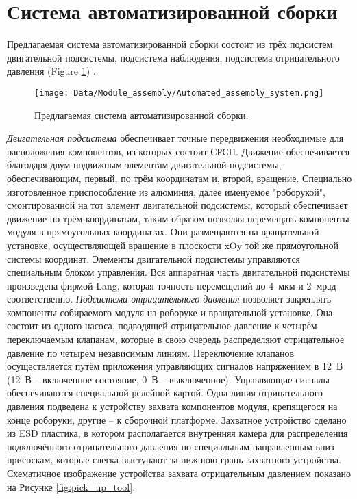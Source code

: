 \section{Система автоматизированной сборки}

Предлагаемая система автоматизированной сборки состоит из трёх подсистем: двигательной подсистемы, подсистема наблюдения, подсистема отрицательного давления (Figure \ref{fig:auto_assembly_system}) \cite{AutomatedAssembly_tutorial}.

\begin{figure}[ht]\centering
\texttt{[image: Data/Module\_assembly/Automated\_assembly\_system.png]}
\caption{Предлагаемая система автоматизированной сборки.}
\label{fig:auto_assembly_system}
\end{figure}

\emph{Двигательная подсистема} обеспечивает точные передвижения необходимые для расположения компонентов, из которых состоит СРСП. Движение обеспечивается благодаря двум подвижным элементам двигательной подсистемы, обеспечивающим, первый, по трём координатам и, второй, вращение. Специально изготовленное приспособление из алюминия, далее именуемое "роборукой", смонтированной на тот элемент двигательной подсистемы, который обеспечивает движение по трём координатам, таким образом позволяя перемещать компоненты модуля в прямоугольных координатах. Они размещаются на вращательной установке, осуществляющей вращение в  плоскости xOy той же прямоугольной системы координат. Элементы двигательной подсистемы управляются специальным блоком управления. Вся аппаратная часть двигательной подсистемы произведена фирмой Lang, которая точность перемещений до 4~мкм и 2~мрад соответственно. \emph{Подсистема отрицательного давления} позволяет закреплять компоненты собираемого модуля на роборуке и вращательной установке. Она состоит из одного насоса, подводящей отрицательное давление к четырём переключаемым клапанам, которые в свою очередь распределяют отрицательное давление по четырём независимым линиям. Переключение клапанов осуществляется путём приложения управляющих сигналов напряжением в 12~В (12~В -- включенное состояние, 0~В -- выключенное). Управляющие сигналы обеспечиваются специальной релейной картой. Одна линия отрицательного давления подведена к устройству захвата компонентов модуля, крепящегося на конце роборуки, другие -- к сборочной платформе. Захватное устройство сделано из ESD пластика, в котором располагается внутренняя камера для распределения подключённого отрицательного давления по специальным направленным вниз присоскам, которые слегка выступают за нижнюю грань захватного устройства. Схематичное изображение устройства захвата отрицательным давлением показано на Рисунке \ref{fig:pick_up_tool}.


